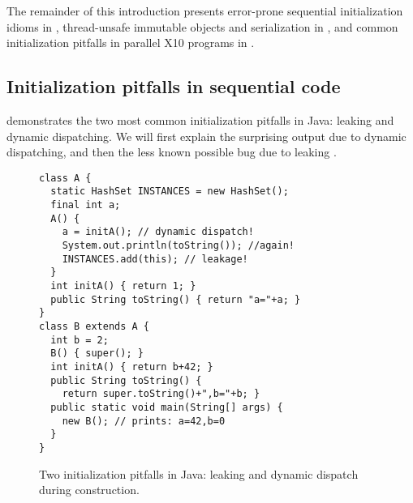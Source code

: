 The remainder of this introduction
    presents error-prone sequential initialization idioms in ,
    thread-unsafe immutable objects and serialization in , and
    common initialization pitfalls in parallel X10 programs in .

\vspace{-0.1cm} %
\subsection{Initialization pitfalls in sequential code}
\label{Section:Initialization-pitfalls}

 demonstrates the two most common initialization pitfalls in Java:
    leaking \this and dynamic dispatching.
We will first explain the surprising output due to dynamic dispatching,
    and then the less known possible bug due to leaking \this.

\begin{figure}
\begin{lstlisting}
class A {
  static HashSet INSTANCES = new HashSet();
  final int a;
  A() {
    a = initA(); // dynamic dispatch!
    System.out.println(toString()); //again!
    INSTANCES.add(this); // leakage!
  }
  int initA() { return 1; }
  public String toString() { return "a="+a; }
}
class B extends A {
  int b = 2;
  B() { super(); }
  int initA() { return b+42; }
  public String toString() {
    return super.toString()+",b="+b; }
  public static void main(String[] args) {
    new B(); // prints: a=42,b=0
  }
}
\end{lstlisting}
\caption{Two initialization pitfalls in Java:
    leaking \this and dynamic dispatch during construction.}
\label{Figure:TwoPitfalls}
\end{figure}

